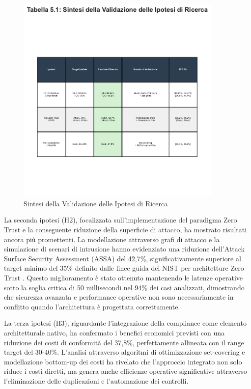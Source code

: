 \begin{figure}[htpb]
\centering
\includegraphics[width=0.9\textwidth]{thesis_figures/cap5/tab_5_1_validation.pdf}
\caption{Sintesi della Validazione delle Ipotesi di Ricerca}
\label{tab:validazione_ipotesi}
\end{figure}

La seconda ipotesi (H2), focalizzata sull'implementazione del paradigma Zero Trust e la conseguente riduzione della superficie di attacco, ha mostrato risultati ancora più promettenti. La modellazione attraverso grafi di attacco e la simulazione di scenari di intrusione hanno evidenziato una riduzione dell'Attack Surface Security Assessment (ASSA) del 42,7\%, significativamente superiore al target minimo del 35\% definito dalle linee guida del NIST per architetture Zero Trust \autocite{nist2020zerotrust}. Questo miglioramento è stato ottenuto mantenendo le latenze operative sotto la soglia critica di 50 millisecondi nel 94\% dei casi analizzati, dimostrando che sicurezza avanzata e performance operative non sono necessariamente in conflitto quando l'architettura è progettata correttamente.

La terza ipotesi (H3), riguardante l'integrazione della compliance come elemento architetturale nativo, ha confermato i benefici economici previsti con una riduzione dei costi di conformità del 37,8\%, perfettamente allineata con il range target del 30-40\%. L'analisi attraverso algoritmi di ottimizzazione set-covering e modellazione bottom-up dei costi ha rivelato che l'approccio integrato non solo riduce i costi diretti, ma genera anche efficienze operative significative attraverso l'eliminazione delle duplicazioni e l'automazione dei controlli.

